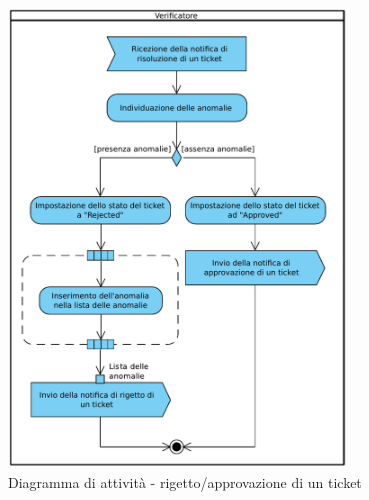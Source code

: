\begin{figure}[H]
\centering
\includegraphics[width=9cm]{../immagini/rigetto_approvazioneTicket.pdf}
\caption{Diagramma di attività - rigetto/approvazione di un ticket}
\label{fig:rigetto_approvazioneTicket}
\end{figure}
